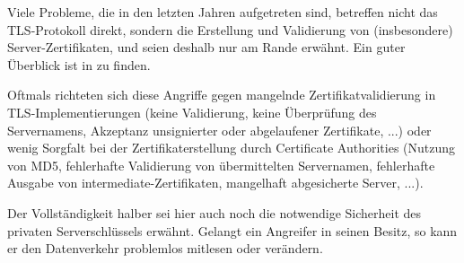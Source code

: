 Viele Probleme, die in den letzten Jahren aufgetreten sind, betreffen nicht das TLS-Protokoll direkt, sondern die Erstellung und Validierung von (insbesondere) Server-Zertifikaten, und seien deshalb nur am Rande erwähnt. Ein guter Überblick ist in \cite{meyer13} zu finden.

Oftmals richteten sich diese Angriffe gegen mangelnde Zertifikatvalidierung in TLS-Implementierungen (keine Validierung, keine Überprüfung des Servernamens, Akzeptanz unsignierter oder abgelaufener Zertifikate, ...) oder wenig Sorgfalt bei der Zertifikaterstellung durch Certificate Authorities (Nutzung von MD5, fehlerhafte Validierung von übermittelten Servernamen, fehlerhafte Ausgabe von intermediate-Zertifikaten, mangelhaft abgesicherte Server, ...).

Der Vollständigkeit halber sei hier auch noch die notwendige Sicherheit des privaten Serverschlüssels erwähnt. Gelangt ein Angreifer in seinen Besitz, so kann er den Datenverkehr problemlos mitlesen oder verändern.